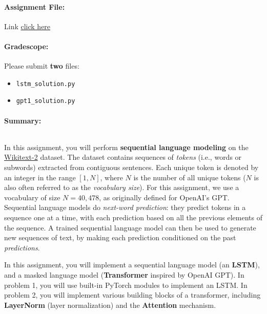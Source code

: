 \documentclass[12pt]{article}
\begin{document}
\setlength{\parindent}{1cm}
\paragraph{Assignment File:} Link \href{https://drive.google.com/file/d/1E10mBJbB1pNFDgUJgPOrSXjW0AqQdS4B/view?usp=sharing}{click here}

\paragraph{Gradescope:}

Please submit \textbf{two} files: 
\begin{itemize}
    \item \texttt{lstm\_solution.py}
    \item \texttt{gpt1\_solution.py}
\end{itemize}

\paragraph{Summary:}

{$ $}

\noindent In this assignment, you will perform \textbf{sequential language modeling} on the \href{https://blog.einstein.ai/the-wikitext-long-term-dependency-language-modeling-dataset/}{Wikitext-2} dataset. The dataset contains sequences of \emph{tokens} (i.e., words or subwords) extracted from contiguous sentences. Each unique token is denoted by an integer in the range $[1, N]$, where $N$ is the number of all unique tokens ($N$ is also often referred to as the \emph{vocabulary size}). For this assignment, we use a vocabulary of size $N = 40,478$, as originally defined for OpenAI's GPT. Sequential language models do \emph{next-word prediction}: they predict tokens in a sequence one at a time, with each prediction based on all the previous elements of the sequence. A trained sequential language model can then be used to generate new sequences of text, by making each prediction conditioned on the past \emph{predictions}.

\noindent In this assignment, you will implement a sequential language model (an \textbf{LSTM}), and a masked language model (\textbf{Transformer} inspired by OpenAI GPT). In problem 1, you will use built-in PyTorch modules to implement an LSTM. In problem 2, you will implement various building blocks of a transformer, including \textbf{LayerNorm} (layer normalization) and the \textbf{Attention} mechanism.
\end{document}
